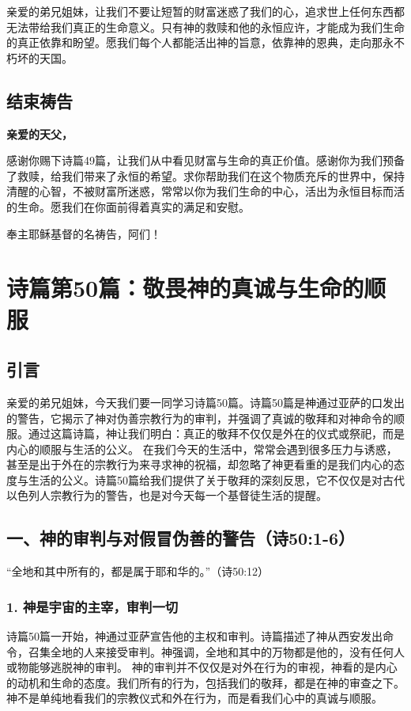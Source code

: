 \documentclass[a4paper, 12pt]{article}
\begin{document}
亲爱的弟兄姐妹，让我们不要让短暂的财富迷惑了我们的心，追求世上任何东西都无法带给我们真正的生命意义。只有神的救赎和他的永恒应许，才能成为我们生命的真正依靠和盼望。愿我们每个人都能活出神的旨意，依靠神的恩典，走向那永不朽坏的天国。

\subsection*{结束祷告}
\textbf{亲爱的天父，}

感谢你赐下诗篇49篇，让我们从中看见财富与生命的真正价值。感谢你为我们预备了救赎，给我们带来了永恒的希望。求你帮助我们在这个物质充斥的世界中，保持清醒的心智，不被财富所迷惑，常常以你为我们生命的中心，活出为永恒目标而活的生命。愿我们在你面前得着真实的满足和安慰。

奉主耶稣基督的名祷告，阿们！
\newpage
\section{诗篇第50篇：敬畏神的真诚与生命的顺服}

\subsection*{引言}
亲爱的弟兄姐妹，今天我们要一同学习诗篇50篇。诗篇50篇是神通过亚萨的口发出的警告，它揭示了神对伪善宗教行为的审判，并强调了真诚的敬拜和对神命令的顺服。通过这篇诗篇，神让我们明白：真正的敬拜不仅仅是外在的仪式或祭祀，而是内心的顺服与生活的公义。
在我们今天的生活中，常常会遇到很多压力与诱惑，甚至是出于外在的宗教行为来寻求神的祝福，却忽略了神更看重的是我们内心的态度与生活的公义。诗篇50篇给我们提供了关于敬拜的深刻反思，它不仅仅是对古代以色列人宗教行为的警告，也是对今天每一个基督徒生活的提醒。
\subsection*{一、神的审判与对假冒伪善的警告（诗50:1-6）}
“全地和其中所有的，都是属于耶和华的。”（诗50:12）

\subsubsection*{1. 神是宇宙的主宰，审判一切}
诗篇50篇一开始，神通过亚萨宣告他的主权和审判。诗篇描述了神从西安发出命令，召集全地的人来接受审判。神强调，全地和其中的万物都是他的，没有任何人或物能够逃脱神的审判。
神的审判并不仅仅是对外在行为的审视，神看的是内心的动机和生命的态度。我们所有的行为，包括我们的敬拜，都是在神的审查之下。神不是单纯地看我们的宗教仪式和外在行为，而是看我们心中的真诚与顺服。
\end{document}
